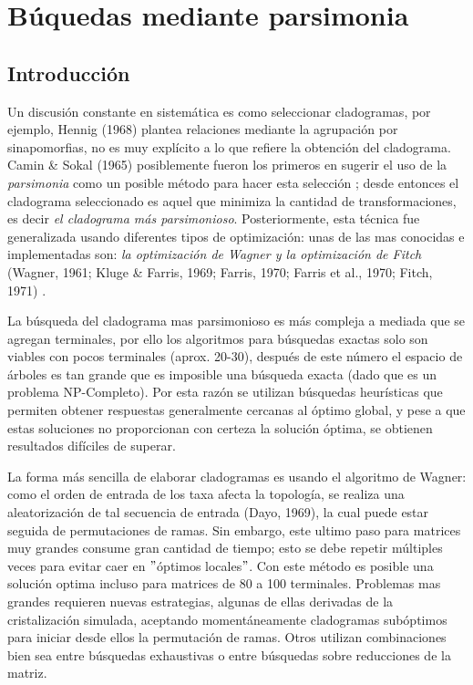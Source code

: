 
\chapter{B\'uquedas mediante parsimonia} %
\label{cha:parsimonia}

\section*{Introducci\'on} 

Un discusi\'on constante en sistem\'atica es como seleccionar cladogramas, por ejemplo, {\color{red}Hennig (1968)} plantea relaciones mediante la agrupaci\'on por sinapomorfias, no es muy expl\'icito a lo que refiere la obtenci\'on del cladograma. {\color{red}Camin \& Sokal (1965)} posiblemente fueron los primeros en sugerir el uso de la \textit{parsimonia} como un posible m\'etodo para hacer esta selecci\'on \cite{Camin1965}; desde entonces el cladograma seleccionado es aquel que minimiza la cantidad de transformaciones, es decir \textit{el cladograma m\'as parsimonioso}. Posteriormente, esta t\'ecnica fue generalizada usando diferentes tipos de optimizaci\'on: unas de las mas conocidas e implementadas son: \textit{la optimizaci\'on de Wagner y la optimizaci\'on de Fitch} {\color{red}(Wagner, 1961; Kluge \& Farris, 1969; Farris, 1970; Farris et al., 1970; Fitch, 1971)} \cite{Wagner1961} \cite{Kluge1969} \cite{Farris1970} \cite{Farris1970a} \cite{Fitch1971}.


La b\'usqueda del cladograma mas parsimonioso es m\'as compleja a mediada que se agregan terminales,  por ello los algoritmos para b\'usquedas exactas solo son viables con pocos terminales (aprox. 20-30),  despu\'es de este n\'umero el espacio de \'arboles es tan grande que es imposible una b\'usqueda exacta (dado que es un problema NP-Completo). Por esta raz\'on se utilizan b\'usquedas heur\'isticas que permiten obtener respuestas generalmente cercanas al \'optimo global,  y pese a que estas soluciones no proporcionan con certeza la soluci\'on \'optima, se obtienen resultados  dif\'iciles de superar.

La forma m\'as sencilla de elaborar cladogramas es usando el algoritmo de Wagner: como el orden de entrada de los taxa afecta la topolog\'ia,  se realiza una aleatorizaci\'on de tal secuencia de entrada {\color{red} (Dayo, 1969)},  la cual puede estar seguida de permutaciones de ramas. Sin embargo,  este ultimo paso para matrices muy grandes consume gran cantidad de tiempo; esto se debe repetir m\'ultiples veces para evitar caer en $"$\'optimos locales$"$. Con este m\'etodo es posible una soluci\'on optima incluso para matrices de 80 a 100 terminales. Problemas mas grandes requieren nuevas estrategias,  algunas de ellas derivadas de la cristalizaci\'on simulada,  aceptando moment\'aneamente cladogramas sub\'optimos para iniciar desde ellos la permutaci\'on de ramas. Otros utilizan combinaciones bien sea entre b\'usquedas exhaustivas o entre b\'usquedas sobre reducciones de la matriz.

